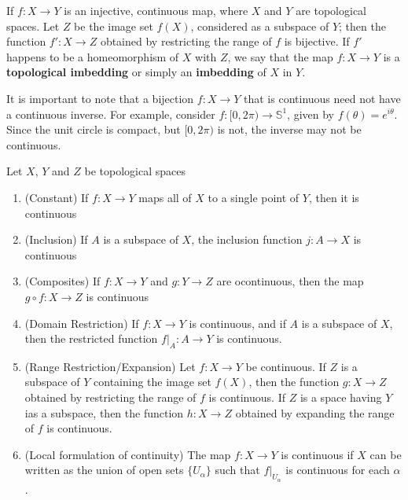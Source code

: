 If $f:X\to Y$ is an injective, continuous map, where $X$ and $Y$ are topological spaces. Let $Z$ be the image set $f(X)$, considered as a subspace of $Y$; then the function $f':X\to Z$ obtained by restricting the range of $f$ is bijective. If $f'$ happens to be a homeomorphism of $X$ with $Z$, we say that the map $f:X\to Y$ is a \textbf{topological imbedding} or simply an \textbf{imbedding} of $X$ in $Y$.

It is important to note that a bijection $f:X\to Y$ that is continuous need not have a continuous inverse. For example, consider $f:[0,2\pi)\to\mathbb{S}^{1}$, given by $f(\theta) = e^{i\theta}$. Since the unit circle is compact, but $[0,2\pi)$ is not, the inverse may not be continuous.

\begin{theorem}
    Let $X$, $Y$ and $Z$ be topological spaces 
    \begin{enumerate}
        \item (Constant) If $f:X\to Y$ maps all of $X$ to a single point of $Y$, then it is continuous 
        \item (Inclusion) If $A$ is a subspace of $X$, the inclusion function $j:A\to X$ is continuous 
        \item (Composites) If $f:X\to Y$ and $g:Y\to Z$ are ocontinuous, then the map $g\circ f: X\to Z$ is continuous
        \item (Domain Restriction) If $f:X\to Y$ is continuous, and if $A$ is a subspace of $X$, then the restricted function $f|_A:A\to Y$ is continuous.
        \item (Range Restriction/Expansion) Let $f:X\to Y$ be continuous. If $Z$ is a subspace of $Y$ containing the image set $f(X)$, then the function $g:X\to Z$ obtained by restricting the range of $f$ is continuous. If $Z$ is a space having $Y$ ias a subspace, then the function $h:X\to Z$ obtained by expanding the range of $f$ is continuous.
        \item (Local formulation of continuity) The map $f:X\to Y$ is continuous if $X$ can be written as the union of open sets $\{U_\alpha\}$ such that $f|_{U_\alpha}$ is continuous for each $\alpha$.
    \end{enumerate}
\end{theorem}
